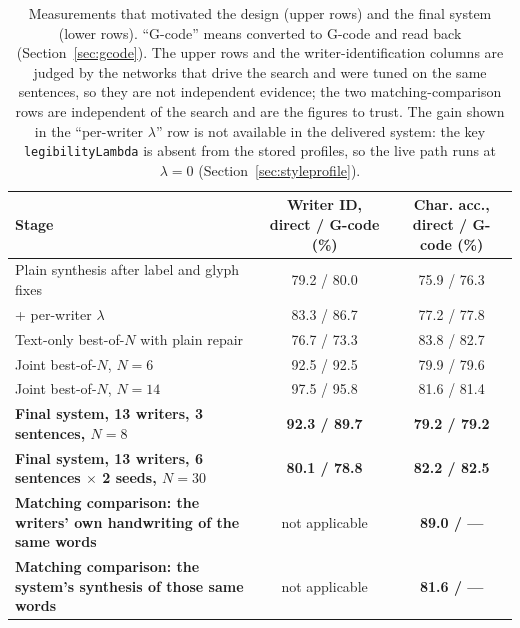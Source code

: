 \begin{table}[!htbp]
\centering
\fontsize{9.5}{11.5}\selectfont
\begin{tabularx}{\linewidth}{|X|c|c|}
\hline
\textbf{Stage} & \textbf{Writer ID, direct / G-code (\%)} & \textbf{Char. acc., direct / G-code (\%)} \\
\hline
Plain synthesis after label and glyph fixes & 79.2 / 80.0 & 75.9 / 76.3 \\
\hline
+ per-writer $\lambda$ & 83.3 / 86.7 & 77.2 / 77.8 \\
\hline
Text-only best-of-$N$ with plain repair & 76.7 / 73.3 & 83.8 / 82.7 \\
\hline
Joint best-of-$N$, $N=6$ & 92.5 / 92.5 & 79.9 / 79.6 \\
\hline
Joint best-of-$N$, $N=14$ & 97.5 / 95.8 & 81.6 / 81.4 \\
\hline
\textbf{Final system, 13 writers, 3 sentences, $N=8$} & \textbf{92.3 / 89.7} & \textbf{79.2 / 79.2} \\
\hline
\textbf{Final system, 13 writers, 6 sentences $\times$ 2 seeds, $N=30$} & \textbf{80.1 / 78.8} & \textbf{82.2 / 82.5} \\
\hline
\textbf{Matching comparison: the writers' own handwriting of the same words} & not applicable & \textbf{89.0 / ---} \\
\hline
\textbf{Matching comparison: the system's synthesis of those same words} & not applicable & \textbf{81.6 / ---} \\
\hline
\end{tabularx}
\caption{Measurements that motivated the design (upper rows) and the final system (lower rows). ``G-code'' means converted to G-code and read back (Section~\ref{sec:gcode}). The upper rows and the writer-identification columns are judged by the networks that drive the search and were tuned on the same sentences, so they are not independent evidence; the two matching-comparison rows are independent of the search and are the figures to trust. The gain shown in the ``per-writer $\lambda$'' row is not available in the delivered system: the key \texttt{legibilityLambda} is absent from the stored profiles, so the live path runs at $\lambda=0$ (Section~\ref{sec:styleprofile}).}
\label{tab:syn-evid}
\end{table}

